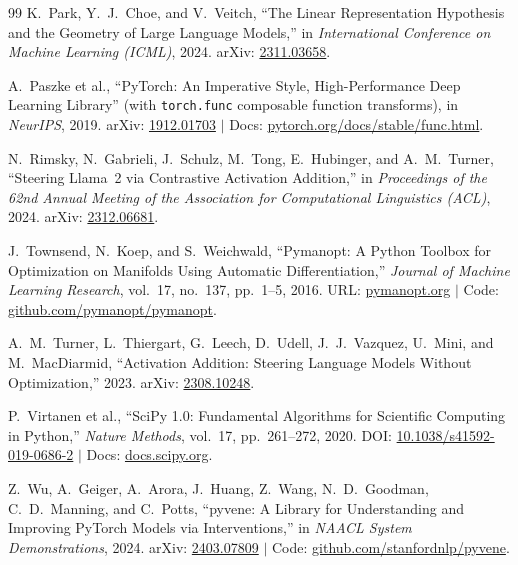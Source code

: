 \documentclass[11pt,a4paper]{article}
\theoremstyle{definition}
\begin{document}
\begin{thebibliography}{99}
K.~Park, Y.~J.~Choe, and V.~Veitch,
``The Linear Representation Hypothesis and the Geometry of Large Language Models,''
in \emph{International Conference on Machine Learning (ICML)}, 2024.
arXiv: \href{https://arxiv.org/abs/2311.03658}{2311.03658}.

A.~Paszke et al.,
``PyTorch: An Imperative Style, High-Performance Deep Learning Library'' (with \texttt{torch.func} composable function transforms),
in \emph{NeurIPS}, 2019.
arXiv: \href{https://arxiv.org/abs/1912.01703}{1912.01703} $\mid$
Docs: \href{https://pytorch.org/docs/stable/func.html}{pytorch.org/docs/stable/func.html}.

N.~Rimsky, N.~Gabrieli, J.~Schulz, M.~Tong, E.~Hubinger, and A.~M.~Turner,
``Steering Llama~2 via Contrastive Activation Addition,''
in \emph{Proceedings of the 62nd Annual Meeting of the Association for Computational Linguistics (ACL)}, 2024.
arXiv: \href{https://arxiv.org/abs/2312.06681}{2312.06681}.

J.~Townsend, N.~Koep, and S.~Weichwald,
``Pymanopt: A Python Toolbox for Optimization on Manifolds Using Automatic Differentiation,''
\emph{Journal of Machine Learning Research}, vol.~17, no.~137, pp.~1--5, 2016.
URL: \href{https://pymanopt.org}{pymanopt.org} $\mid$
Code: \href{https://github.com/pymanopt/pymanopt}{github.com/pymanopt/pymanopt}.

A.~M.~Turner, L.~Thiergart, G.~Leech, D.~Udell, J.~J.~Vazquez, U.~Mini, and M.~MacDiarmid,
``Activation Addition: Steering Language Models Without Optimization,'' 2023.
arXiv: \href{https://arxiv.org/abs/2308.10248}{2308.10248}.

P.~Virtanen et al.,
``SciPy 1.0: Fundamental Algorithms for Scientific Computing in Python,''
\emph{Nature Methods}, vol.~17, pp.~261--272, 2020.
DOI: \href{https://doi.org/10.1038/s41592-019-0686-2}{10.1038/s41592-019-0686-2} $\mid$
Docs: \href{https://docs.scipy.org/doc/scipy/}{docs.scipy.org}.

Z.~Wu, A.~Geiger, A.~Arora, J.~Huang, Z.~Wang, N.~D.~Goodman, C.~D.~Manning, and C.~Potts,
``pyvene: A Library for Understanding and Improving PyTorch Models via Interventions,''
in \emph{NAACL System Demonstrations}, 2024.
arXiv: \href{https://arxiv.org/abs/2403.07809}{2403.07809} $\mid$
Code: \href{https://github.com/stanfordnlp/pyvene}{github.com/stanfordnlp/pyvene}.


\end{thebibliography}
\end{document}
